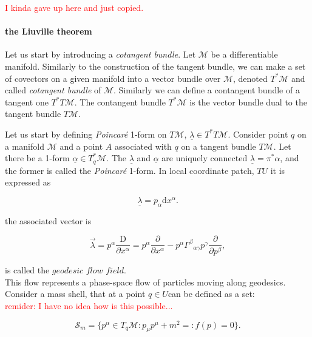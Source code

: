 \documentclass[11pt,a4paper,headinclude=true,DIV=14,BCOR=8mm,chapterprefix,listof=totoc,twoside,openright,abstracton]{scrbook}
\begin{document}
\textcolor{red}{I kinda gave up here and just copied.}


\paragraph{the Liuville theorem}

Let us start by introducing a \textit{cotangent bundle}. Let $\mathcal{M}$ be a differentiable manifold. Similarly to the construction of the tangent bundle, we can make a set of covectors on a given manifold into a vector bundle over $\mathcal{M}$, denoted $T^*\mathcal{M}$ and called \textit{cotangent bundle} of $\mathcal{M}$.  Similarly we can define a contangent bundle of a tangent one $T^*T\mathcal{M}$. The contangent bundle $T^*\mathcal{M}$ is the vector bundle dual to the tangent bundle $T\mathcal{M}$. 

Let us start by defining \textit{Poincar\'e} 1-form on $T\mathcal{M}$, $\underline{\lambda}\in T^* T\mathcal{M}$. Consider point $q$ on a manifold $\mathcal{M}$ and a point $A$ associated with $q$ on a tangent bundle $T\mathcal{M}$. Let there be a 1-form $\underline{\alpha}\in T^* _q\mathcal{M}$. The $\underline{\lambda}$ and $\underline{\alpha}$ are uniquely connected $\underline{\lambda} = \pi^* \alpha$, and the former is called the \textit{Poincar\'e} 1-form. In local coordinate patch, $TU$ it is expressed as

\begin{equation}
    \underline{\lambda} = p_{\alpha} \text{d}x^{\alpha}.
\end{equation}

the associated vector is 

\begin{equation}
    \vec{\lambda} = p^{\alpha} \frac{\text{D}}{\partial x^{\alpha}} = p^{\alpha}\frac{\partial}{\partial x^{\alpha}} - p^{\alpha}{\Gamma^{\beta}}_{\alpha\gamma}p^{\gamma}\frac{\partial}{\partial p^{\beta}},
\end{equation}

is called the $\textit{geodesic flow field}$. \\
This flow represents a phase-space flow of particles moving along geodesics. \\

Consider a mass shell, that at a point $q\in U$can be defined as a set:\\
\textcolor{red}{remider: I have no idea how is this possible...}

\begin{equation}
    \mathcal{S}_m = \big\{ p^{\alpha}\in T_q\mathcal{M}: p_{\mu}p^{\mu}+m^2 =:f(p) = 0 \big\}.
\end{equation}
\end{document}
